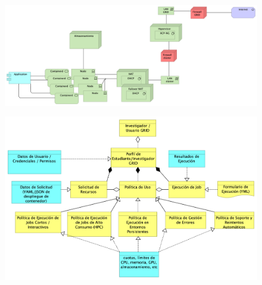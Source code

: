 \begin{figure}[H]
    \centering
    \includegraphics[width=\textwidth]{tablas-images/cp6/Implementation-and-Installation-View.png}
\end{figure}
\begin{figure}[H]
    \centering
    \includegraphics[width=\textwidth]{tablas-images/cp6/Information-Structure-View.png}
\end{figure}